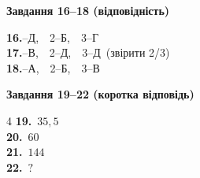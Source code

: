 \documentclass[12pt]{article}
\begin{document}
\par\vspace{0.3cm}
\noindent\textbf{\large Завдання 16--18 (відповідність)}
\par\vspace{0.2cm}
\noindent
\textbf{16.}--Д,\ \ 2--Б,\ \ 3--Г\\[0.15cm]
\textbf{17.}--В,\ \ 2--Д,\ \ 3--Д\ (звірити 2\slash 3)\\[0.15cm]
\textbf{18.}--А,\ \ 2--Б,\ \ 3--В

\par\vspace{0.3cm}
\noindent\textbf{\large Завдання 19--22 (коротка відповідь)}
\par\vspace{0.2cm}
\begin{multicols}{4}
\noindent
\textbf{19.}~$35{,}5$\\
\textbf{20.}~$60$\\
\textbf{21.}~$144$\\
\textbf{22.}~$?$
\end{multicols}
\end{document}
